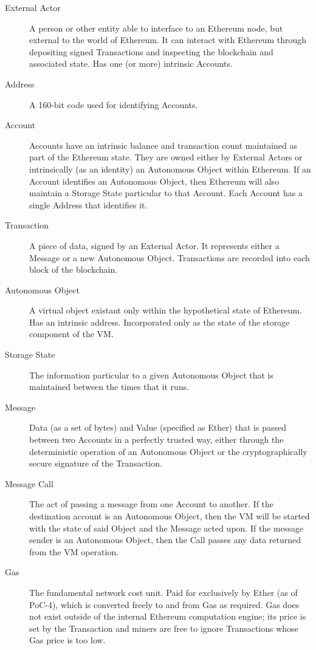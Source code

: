 \documentclass[9pt,oneside]{amsart}
\begin{document}
\begin{description}
\item[External Actor] A person or other entity able to interface to an Ethereum node, but external to the world of Ethereum. It can interact with Ethereum through depositing signed Transactions and inspecting the blockchain and associated state. Has one (or more) intrinsic Accounts.

\item[Address] A 160-bit code used for identifying Accounts.

\item[Account] Accounts have an intrinsic balance and transaction count maintained as part of the Ethereum state. They are owned either by External Actors or intrinsically (as an identity) an Autonomous Object within Ethereum. If an Account identifies an Autonomous Object, then Ethereum will also maintain a Storage State particular to that Account. Each Account has a single Address that identifies it.

\item[Transaction] A piece of data, signed by an External Actor. It represents either a Message or a new Autonomous Object. Transactions are recorded into each block of the blockchain.

\item[Autonomous Object] A virtual object existant only within the hypothetical state of Ethereum.  Has an intrinsic address. Incorporated only as the state of the storage component of the VM.

\item[Storage State] The information particular to a given Autonomous Object that is maintained between the times that it runs.

\item[Message] Data (as a set of bytes) and Value (specified as Ether) that is passed between two Accounts in a perfectly trusted way, either through the deterministic operation of an Autonomous Object or the cryptographically secure signature of the Transaction.

\item[Message Call] The act of passing a message from one Account to another. If the destination account is an Autonomous Object, then the VM will be started with the state of said Object and the Message acted upon. If the message sender is an Autonomous Object, then the Call passes any data returned from the VM operation.

\item[Gas] The fundamental network cost unit. Paid for exclusively by Ether (as of PoC-4), which is converted freely to and from Gas as required. Gas does not exist outside of the internal Ethereum computation engine; its price is set by the Transaction and miners are free to ignore Transactions whose Gas price is too low.


\end{description}
\end{document}
